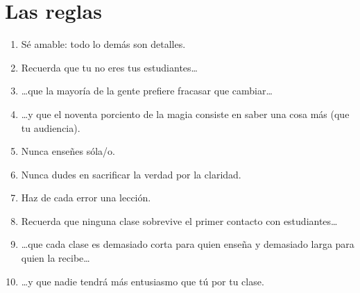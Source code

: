 \chapter*{Las reglas}

\begin{enumerate}

\item Sé amable: todo lo demás son detalles.\\

\item Recuerda que tu no eres tus  estudiantes{\ldots}\\

\item {\ldots}que la mayoría de la gente prefiere fracasar  que cambiar{\ldots}\\

\item {\ldots}y que el noventa porciento de la magia consiste en saber una cosa más (que tu audiencia).\\

\item Nunca enseñes sóla/o.\\

\item Nunca dudes en sacrificar la verdad por la claridad.\\

\item Haz de cada error una lección.\\

\item Recuerda que ninguna clase sobrevive el primer contacto con estudiantes{\ldots}\\

\item {\ldots}que cada clase es demasiado corta para quien enseña y demasiado larga para quien la recibe{\ldots}\\

\item {\ldots}y que nadie tendrá más entusiasmo que tú por tu clase.

\end{enumerate}

